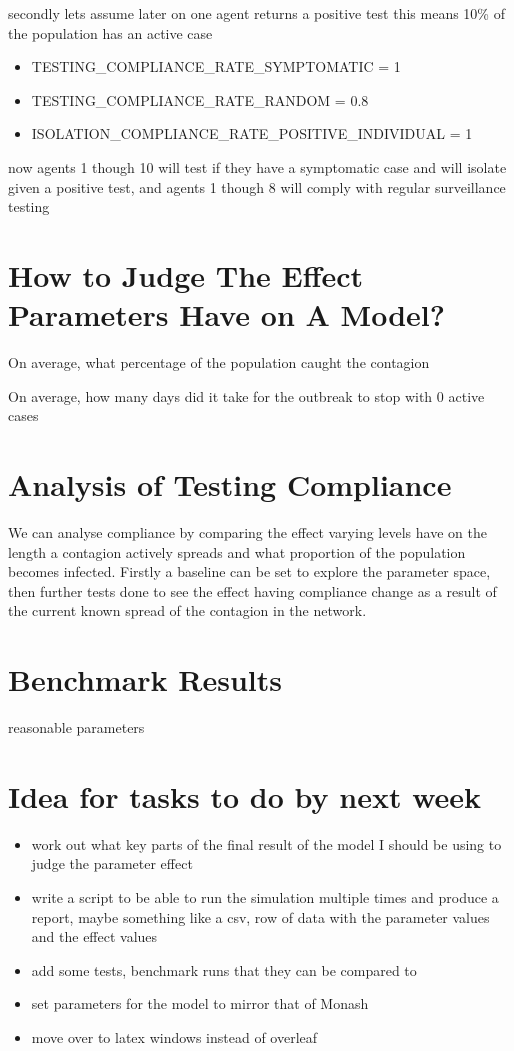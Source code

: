 \documentclass{article}
\begin{document}
secondly lets assume later on one agent returns a positive test this means 10\% of the population has an active case
\begin{itemize}
\item TESTING\_COMPLIANCE\_RATE\_SYMPTOMATIC = 1\
\item TESTING\_COMPLIANCE\_RATE\_RANDOM = 0.8 \
\item ISOLATION\_COMPLIANCE\_RATE\_POSITIVE\_INDIVIDUAL = 1
\end{itemize}
now agents 1 though 10 will test if they have a symptomatic case and will isolate given a positive test, and agents 1 though 8 will comply with regular surveillance testing

\section{How to Judge The Effect Parameters Have on A Model?}
On average, what percentage of the population caught the contagion

On average, how many days did it take for the outbreak to stop with 0 active cases

\section{Analysis of Testing Compliance}
We can analyse compliance by comparing the effect varying levels have on the length a contagion actively spreads and what proportion of the population becomes infected. Firstly a baseline can be set to explore the parameter space, then further tests done to see the effect having compliance change as a result of the current known spread of the contagion in the network.

\section{Benchmark Results}
reasonable parameters 

\section{Idea for tasks to do by next week}
\begin{itemize}
\item work out what key parts of the final result of the model I should be using to judge the parameter effect
\item write a script to be able to run the simulation multiple times and produce a report, maybe something like a csv, row of data with the parameter values and the effect values 
\item add some tests, benchmark runs that they can be compared to
\item set parameters for the model to mirror that of Monash
\item move over to latex windows instead of overleaf
\end{itemize}
\end{document}
